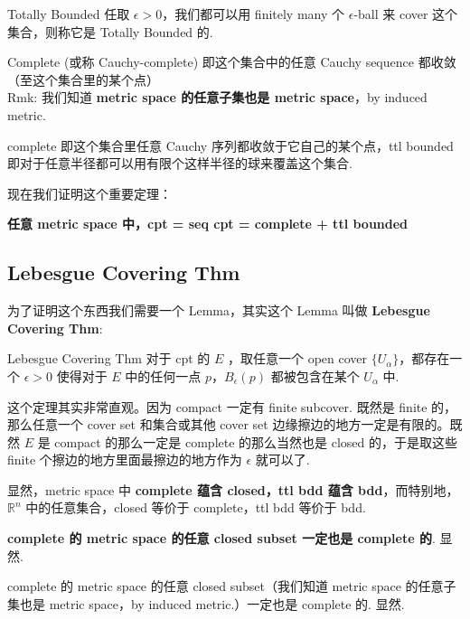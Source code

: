 \documentclass[lang=cn,11pt]{elegantbook}
\begin{document}
\begin{definition}{Totally Bounded} \label{ttlbdd}
    任取 $\epsilon > 0$，我们都可以用 finitely many 个 $\epsilon$-ball 来 cover 这个集合，则称它是 Totally Bounded 的.
\end{definition}

\begin{definition}{Complete (或称 Cauchy-complete)} \label{cplt}
    即这个集合中的任意 Cauchy sequence 都收敛（至这个集合里的某个点）
    \\Rmk: 我们知道 \textbf{metric space 的任意子集也是 metric space}，by induced metric.
\end{definition}

\begin{remark}
complete 即这个集合里任意 Cauchy 序列都收敛于它自己的某个点，ttl bounded 即对于任意半径都可以用有限个这样半径的球来覆盖这个集合.
\end{remark}



现在我们证明这个重要定理：
\begin{theorem}
    \textbf{任意 metric space 中，cpt = seq cpt = complete + ttl bounded}
\end{theorem}

\subsection{Lebesgue Covering Thm}
为了证明这个东西我们需要一个 Lemma，其实这个 Lemma 叫做 \textbf{Lebesgue Covering Thm}:  
\begin{lemma}{Lebesgue Covering Thm} \label{lbg covering thm}
    对于 cpt 的 $E$ ，取任意一个 open cover $\{U_{\alpha}\}$，都存在一个 $\epsilon > 0$ 使得对于 $E$ 中的任何一点 $p$，$B_{\epsilon}(p)$ 都被包含在某个 $U_{\alpha}$ 中.
\end{lemma}
\proof 这个定理其实非常直观。因为 compact 一定有 finite subcover. 既然是 finite 的，那么任意一个 cover set 和集合或其他 cover set 边缘擦边的地方一定是有限的。既然 $E$ 是 compact 的那么一定是 complete 的那么当然也是 closed 的，于是取这些 finite 个擦边的地方里面最擦边的地方作为 $\epsilon$ 就可以了.

\begin{remark}
    显然，metric space 中 \textbf{complete 蕴含 closed，ttl bdd 蕴含 bdd}，而特别地， $\mathbb{R}^n$ 中的任意集合，closed 等价于 complete，ttl bdd 等价于 bdd.
\end{remark}

\begin{theorem}
    \textbf{complete 的 metric space 的任意 closed subset 一定也是 complete 的}. 显然.
\end{theorem}
complete 的 metric space 的任意 closed subset（我们知道 metric space 的任意子集也是 metric space，by induced metric.）一定也是 complete 的. 显然.
\end{document}
